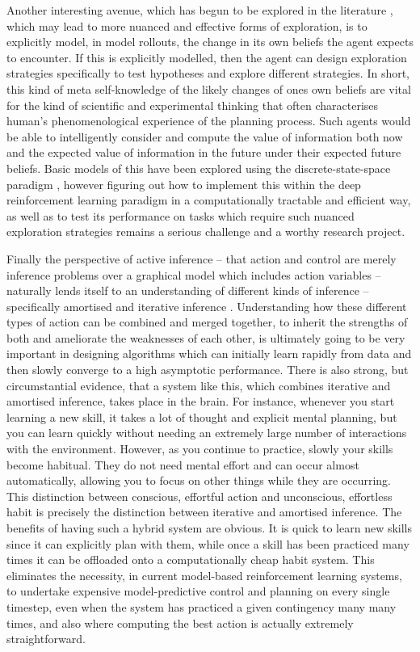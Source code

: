 Another interesting avenue, which has begun to be explored in the literature \citep{friston2020sophisticated}, which may lead to more nuanced and effective forms of exploration, is to explicitly model, in model rollouts, the change in its own beliefs the agent expects to encounter. If this is explicitly modelled, then the agent can design exploration strategies specifically to test hypotheses and explore different strategies. In short, this kind of meta self-knowledge of the likely changes of ones own beliefs are vital for the kind of scientific and experimental thinking that often characterises human's phenomenological experience of the planning process. Such agents would be able to intelligently consider and compute the value of information both now and the expected value of information in the future under their expected future beliefs. Basic models of this have been explored using the discrete-state-space paradigm \citep{friston2020sophisticated,hesp2020sophisticated}, however figuring out how to implement this within the deep reinforcement learning paradigm in a computationally tractable and efficient way, as well as to test its performance on tasks which require such nuanced exploration strategies remains a serious challenge and a worthy research project.

Finally the perspective of active inference -- that action and control are merely inference problems over a graphical model which includes action variables -- naturally lends itself to an understanding of different kinds of inference -- specifically amortised and iterative inference \citep{millidge2020reinforcement,kim2018semi,marino2018iterative}. Understanding how these different types of action can be combined and merged together, to inherit the strengths of both and ameliorate the weaknesses of each other, is ultimately going to be very important in designing algorithms which can initially learn rapidly from data and then slowly converge to a high asymptotic performance. There is also strong, but circumstantial evidence, that a system like this, which combines iterative and amortised inference, takes place in the brain. For instance, whenever you start learning a new skill, it takes a lot of thought and explicit mental planning, but you can learn quickly without needing an extremely large number of interactions with the environment. However, as you continue to practice, slowly your skills become habitual. They do not need mental effort and can occur almost automatically, allowing you to focus on other things while they are occurring. This distinction between conscious, effortful action and unconscious, effortless habit is precisely the distinction between iterative and amortised inference. The benefits of having such a hybrid system are obvious. It is quick to learn new skills since it can explicitly plan with them, while once a skill has been practiced many times it can be offloaded onto a computationally cheap habit system. This eliminates the necessity, in current model-based reinforcement learning systems, to undertake expensive model-predictive control and planning on every single timestep, even when the system has practiced a given contingency many many times, and also where computing the best action is actually extremely straightforward.

